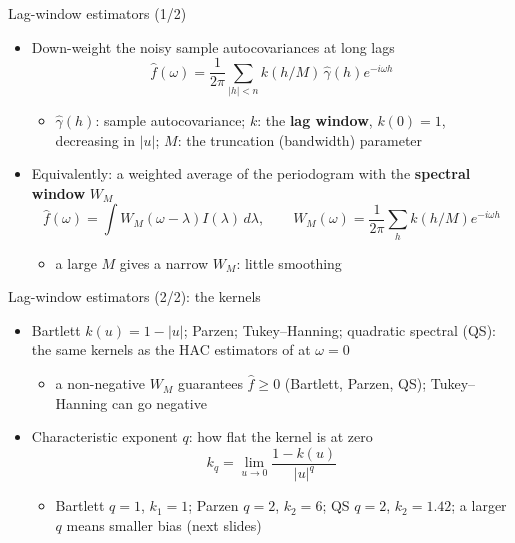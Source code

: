 \begin{frame}{Lag-window estimators (1/2)}
\itemsize{\small}
\begin{itemize}
    \item Down-weight the noisy sample autocovariances at long lags 
    \[ \hat f(\omega) = \frac{1}{2\pi}\sum_{|h| < n}k(h/M)\,\hat\gamma(h)e^{-i\omega h} \]
    \begin{itemize}
        \item $\hat\gamma(h)$: sample autocovariance; $k$: the \textbf{lag window}, $k(0) = 1$, decreasing in $|u|$; $M$: the truncation (bandwidth) parameter
    \end{itemize}
    \item Equivalently: a weighted average of the periodogram with the \textbf{spectral window} $W_M$
    \[ \hat f(\omega) = \int W_M(\omega - \lambda)I(\lambda)\,d\lambda, \qquad W_M(\omega) = \frac{1}{2\pi}\sum_h k(h/M)e^{-i\omega h} \]
    \begin{itemize}
        \item a large $M$ gives a narrow $W_M$: little smoothing
    \end{itemize}
\end{itemize}
\end{frame}

\begin{frame}{Lag-window estimators (2/2): the kernels}
\itemsize{\small}
\begin{itemize}
    \item Bartlett $k(u) = 1 - |u|$; Parzen; Tukey--Hanning; quadratic spectral (QS): the same kernels as the HAC estimators of  at $\omega = 0$
    \begin{itemize}
        \item a non-negative $W_M$ guarantees $\hat f \ge 0$ (Bartlett, Parzen, QS); Tukey--Hanning can go negative
    \end{itemize}
    \item Characteristic exponent $q$: how flat the kernel is at zero
    \[ k_q = \lim_{u \to 0}\frac{1 - k(u)}{|u|^q} \]
    \begin{itemize}
        \item Bartlett $q = 1$, $k_1 = 1$; Parzen $q = 2$, $k_2 = 6$; QS $q = 2$, $k_2 = 1.42$; a larger $q$ means smaller bias (next slides)
    \end{itemize}
\end{itemize}
\end{frame}

